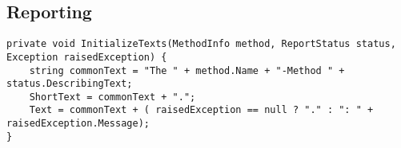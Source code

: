 \subsection{Reporting}

\begin{lstlisting}[caption={[Quellcode der \textit{InitializeTexts}-Methode von \textit{MethodReport}]Quellcode der \textit{InitializeTexts}-Methode von \textit{MethodReport}}, label=code:MethodReport_InitializeTexts]
private void InitializeTexts(MethodInfo method, ReportStatus status, Exception raisedException) {
    string commonText = "The " + method.Name + "-Method " + status.DescribingText;
    ShortText = commonText + ".";
    Text = commonText + ( raisedException == null ? "." : ": " + raisedException.Message);
}
\end{lstlisting}